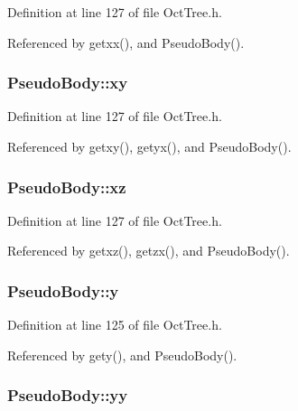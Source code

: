 Definition at line 127 of file OctTree.h.



Referenced by getxx(), and PseudoBody().

\subsubsection[{xy}]{ {\bf PseudoBody::xy}}\label{classPseudoBody_a3640e978dfc953cf5ed3f27ea99226f7}


Definition at line 127 of file OctTree.h.



Referenced by getxy(), getyx(), and PseudoBody().

\subsubsection[{xz}]{ {\bf PseudoBody::xz}}\label{classPseudoBody_a6d5d2607dc83899e69f7044772662ba8}


Definition at line 127 of file OctTree.h.



Referenced by getxz(), getzx(), and PseudoBody().

\subsubsection[{y}]{ {\bf PseudoBody::y}}\label{classPseudoBody_a6b3efb100ca3519c867639235eed21c8}


Definition at line 125 of file OctTree.h.



Referenced by gety(), and PseudoBody().

\subsubsection[{yy}]{ {\bf PseudoBody::yy}}\label{classPseudoBody_a5f48c70435083ed9e70e49bae5d6c062}


